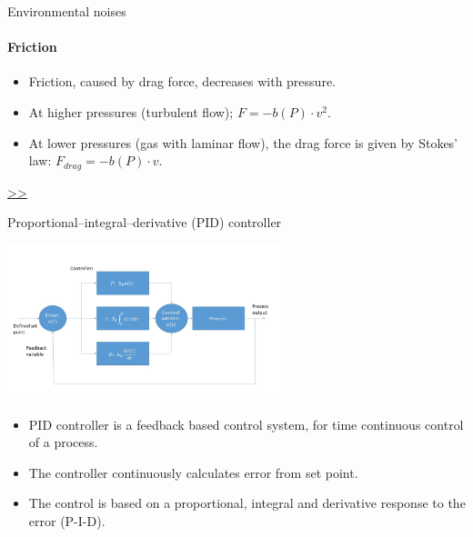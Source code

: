 \documentclass{beamer}
\begin{document}
\begin{frame}{Environmental noises}
	\framesubtitle{Friction}
	\begin{itemize}
		\item Friction, caused by drag force, decreases with pressure.		
		\item At higher pressures (turbulent flow); $F = -b(P)\cdot v^2 $.
		\item At lower pressures (gas with laminar flow), the drag force is given by Stokes' law: $F_{drag} =  -b(P)\cdot v$.	
		
	\end{itemize}
	\hyperlink{frame:Proportional–integral–derivative (PID) controller}{>>} 
\end{frame}


\begin{frame}{\hypertarget{frame:Proportional–integral–derivative (PID) controller}{Proportional–integral–derivative (PID) controller}}
	\begin{center}		
		\includegraphics[width=0.6\textwidth,keepaspectratio]{pid_diagram_powerpoint.jpg}
    \end{center}
	\begin{itemize}	
		\item PID controller is a feedback based control system, for time continuous control of a process.
		\item The controller continuously calculates error from set point. 
		\pause
		\item The control is based on a proportional, integral and derivative response to the error (P-I-D).
	\end{itemize}
\end{frame}
\end{document}
